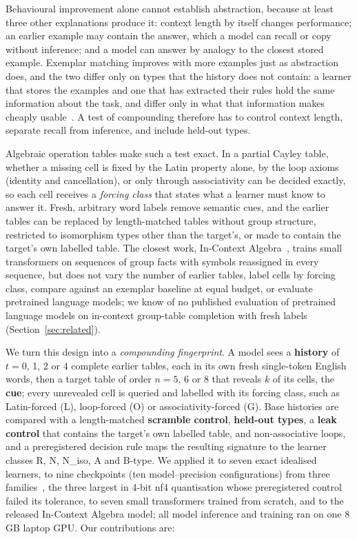 \documentclass[11pt]{article}
\begin{document}
Behavioural improvement alone cannot establish abstraction, because at least three other explanations produce it: context length by itself changes performance; an earlier example may contain the answer, which a model can recall or copy without inference; and a model can answer by analogy to the closest stored example. Exemplar matching improves with more examples just as abstraction does, and the two differ only on types that the history does not contain: a learner that stores the examples and one that has extracted their rules hold the same information about the task, and differ only in what that information makes cheaply usable~\cite{xu2020usable}. A test of compounding therefore has to control context length, separate recall from inference, and include held-out types.

Algebraic operation tables make such a test exact. In a partial Cayley table, whether a missing cell is fixed by the Latin property alone, by the loop axioms (identity and cancellation), or only through associativity can be decided exactly, so each cell receives a \emph{forcing class} that states what a learner must know to answer it. Fresh, arbitrary word labels remove semantic cues, and the earlier tables can be replaced by length-matched tables without group structure, restricted to isomorphism types other than the target's, or made to contain the target's own labelled table. The closest work, In-Context Algebra~\cite{todd2026ica}, trains small transformers on sequences of group facts with symbols reassigned in every sequence, but does not vary the number of earlier tables, label cells by forcing class, compare against an exemplar baseline at equal budget, or evaluate pretrained language models; we know of no published evaluation of pretrained language models on in-context group-table completion with fresh labels (Section~\ref{sec:related}).

We turn this design into a \emph{compounding fingerprint}. A model sees a \textbf{history} of $t = 0$, 1, 2 or 4 complete earlier tables, each in its own fresh single-token English words, then a target table of order $n = 5$, 6 or 8 that reveals $k$ of its cells, the \textbf{cue}; every unrevealed cell is queried and labelled with its forcing class, such as Latin-forced (L), loop-forced (O) or associativity-forced (G). Base histories are compared with a length-matched \textbf{scramble control}, \textbf{held-out types}, a \textbf{leak control} that contains the target's own labelled table, and non-associative loops, and a preregistered decision rule maps the resulting signature to the learner classes R, N, N\_iso, A and B-type. We applied it to seven exact idealised learners, to nine checkpoints (ten model--precision configurations) from three families~\cite{qwen3,smollm2,olmo2}, the three largest in 4-bit nf4 quantisation whose preregistered control failed its tolerance, to seven small transformers trained from scratch, and to the released In-Context Algebra model; all model inference and training ran on one 8 GB laptop GPU. Our contributions are:
\end{document}
